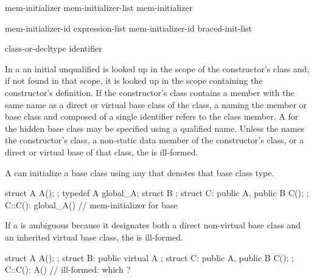 \begin{bnf}
\br
    mem-initializer \opt\br
    mem-initializer-list \terminal{,} mem-initializer \opt
\end{bnf}

\begin{bnf}
\br
    mem-initializer-id \terminal{(} expression-list\opt \terminal{)}\br
    mem-initializer-id braced-init-list
\end{bnf}

\begin{bnf}
\br
    class-or-decltype\br
    identifier
\end{bnf}

\pnum
In a  an initial unqualified
 is looked up in the scope of the constructor's class
and, if not found in that scope, it is looked up in the scope containing the
constructor's definition.
\enternote
If the constructor's class contains a member with the same name as a direct
or virtual base class of the class, a
naming the member or base class and composed of a single identifier
refers to the class member.
A
for the hidden base class may be specified using a qualified name.
\exitnote
Unless the
names the constructor's class,
a non-static data member of the constructor's class, or
a direct or virtual base of that class,
the
is ill-formed.

\pnum
A
can initialize a base class using any  that denotes that base class type.
\enterexample

\begin{codeblock}
struct A { A(); };
  typedef A global_A;
  struct B { };
  struct C: public A, public B { C(); };
  C::C(): global_A() { }        // mem-initializer for base 
\end{codeblock}
\exitexample

\pnum
If a
is ambiguous because it designates both a direct non-virtual base class and
an inherited virtual base class, the
is ill-formed.
\enterexample

\begin{codeblock}
struct A { A(); };
struct B: public virtual A { };
struct C: public A, public B { C(); };
C::C(): A() { }                 // ill-formed: which ?
\end{codeblock}
\exitexample

